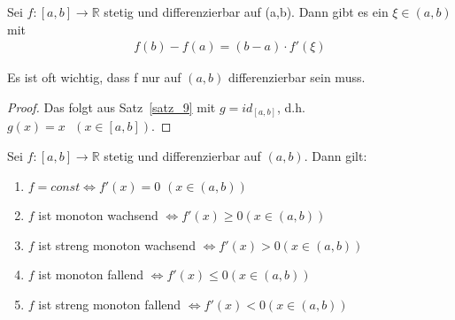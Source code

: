\begin{Satz}{\label{vl_07_MWS}
	Sei $f: [a,b] \rightarrow \mathbb{R}$ stetig und differenzierbar auf 
	(a,b). Dann gibt es ein $\xi \in (a,b)$ mit 
	\begin{align*}
		f(b) -f(a) = (b-a) \cdot f'(\xi)
	\end{align*}
}\end{Satz}

\begin{Bemerkung}{
	 Es ist oft wichtig, dass f nur auf $(a,b)$ differenzierbar 
	sein muss.
}\end{Bemerkung}

\begin{proof}
	Das folgt aus Satz~\ref{satz_9}
	mit $g = id_{[a,b]}$, d.h. $g(x) = x \textbf{ } (x \in [a,b])$.
\end{proof}


\begin{Satz}{
	\label{satz_11}
	Sei $f:[a,b] \rightarrow \mathbb{R}$ stetig und differenzierbar auf $(a,b)$. 
	Dann gilt:
	\renewcommand{\labelenumi}{\alph{enumi})}
	\begin{enumerate}
		\item $f = const \Leftrightarrow f'(x) = 0$ $(x\in(a,b))$
		\item $f$ ist monoton wachsend $\Leftrightarrow f'(x) \geq 0 (x \in (a,b))$
		\item $f$ ist streng monoton wachsend $\Leftrightarrow f'(x) > 0 (x \in (a,b
		))$
		\item $f$ ist monoton fallend $\Leftrightarrow f'(x) \leq 0 (x \in (a,b))$
		\item $f$ ist streng monoton fallend $\Leftrightarrow f'(x) < 0 
		(x \in (a,b))$ 
	\end{enumerate}
}\end{Satz}


